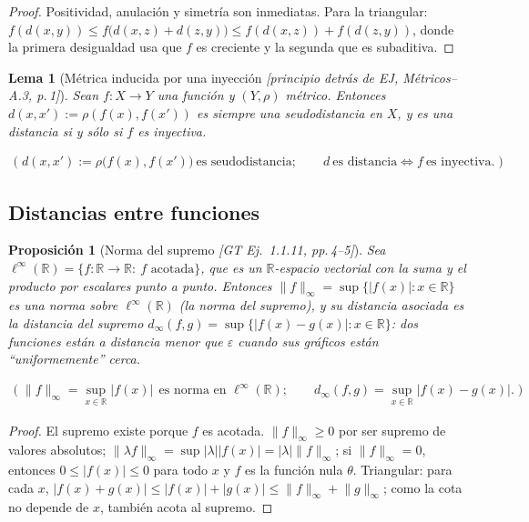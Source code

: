 \documentclass[11pt,a4paper]{article}
\newcommand{\lgc}[1]{\par\vspace{-3pt}\begin{gather*}\big(\;#1\;\big)\end{gather*}\vspace{-6pt}}
\theoremstyle{definition}
\theoremstyle{plain}
\newtheorem{proposicion}[definicion]{Proposición}
\newtheorem{lema}[definicion]{Lema}
\newcommand{\fnt}[1]{{\normalfont\small\itshape\color{gray!150!black}[#1]}}
\newcommand{\R}{\mathbb{R}}
\newcommand{\norm}[1]{\lVert #1 \rVert}
\begin{document}
\begin{proof}
Positividad, anulación y simetría son inmediatas. Para la triangular:
$f(d(x,y))\le f\big(d(x,z)+d(z,y)\big)\le f(d(x,z))+f(d(z,y))$, donde la primera desigualdad usa que $f$ es creciente y la segunda que es subaditiva.
\end{proof}


\begin{lema}[Métrica inducida por una inyección \fnt{principio detrás de EJ, Métricos--A.3, p.\,1}]
Sean $f:X\to Y$ una función y $(Y,\rho)$ métrico. Entonces $d(x,x'):=\rho(f(x),f(x'))$ es siempre una seudodistancia en $X$, y es una distancia si y sólo si $f$ es inyectiva.
\lgc{d(x,x'):=\rho\big(f(x),f(x')\big)\ \text{es seudodistancia};\qquad
d\ \text{es distancia}\iff f\ \text{es inyectiva}.}
\end{lema}





\subsection{Distancias entre funciones}\label{hu:secfunc}

\begin{proposicion}[Norma del supremo \fnt{GT Ej.\ 1.1.11, pp.\,4--5}]\label{hu:supnorm}
Sea $\ell^\infty(\R)=\{f:\R\to\R:\ f \text{ acotada}\}$, que es un $\R$-espacio vectorial con la suma y el producto por escalares punto a punto. Entonces $\norm{f}_\infty=\sup\{|f(x)|: x\in\R\}$ es una norma sobre $\ell^\infty(\R)$ (la \emph{norma del supremo}), y su distancia asociada es la \emph{distancia del supremo} $d_\infty(f,g)=\sup\{|f(x)-g(x)|: x\in\R\}$: dos funciones están a distancia menor que $\varepsilon$ cuando sus gráficos están ``uniformemente'' cerca.
\lgc{\norm{f}_\infty=\sup_{x\in\R}|f(x)|\ \ \text{es norma en } \ell^\infty(\R);\qquad d_\infty(f,g)=\sup_{x\in\R}|f(x)-g(x)|.}
\end{proposicion}

\begin{proof}
El supremo existe porque $f$ es acotada. $\norm{f}_\infty\ge0$ por ser supremo de valores absolutos; $\norm{\lambda f}_\infty=\sup|\lambda||f(x)|=|\lambda|\norm{f}_\infty$; si $\norm{f}_\infty=0$, entonces $0\le|f(x)|\le 0$ para todo $x$ y $f$ es la función nula $\theta$. Triangular: para cada $x$, $|f(x)+g(x)|\le|f(x)|+|g(x)|\le\norm{f}_\infty+\norm{g}_\infty$; como la cota no depende de $x$, también acota al supremo.
\end{proof}
\end{document}
